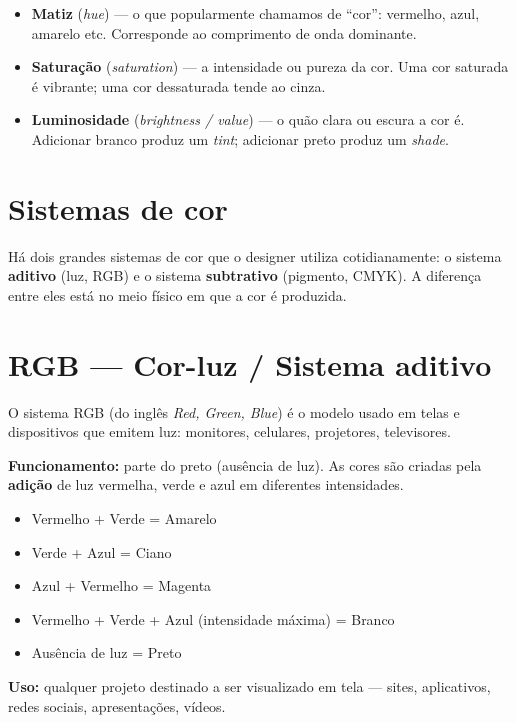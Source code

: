 \documentclass[a4paper,12pt]{article}
\begin{document}
\begin{itemize}[nosep]
  \item \textbf{Matiz} (\textit{hue}) --- o que popularmente chamamos de ``cor'': vermelho, azul, amarelo etc. Corresponde ao comprimento de onda dominante.
  \item \textbf{Saturação} (\textit{saturation}) --- a intensidade ou pureza da cor. Uma cor saturada é vibrante; uma cor dessaturada tende ao cinza.
  \item \textbf{Luminosidade} (\textit{brightness / value}) --- o quão clara ou escura a cor é. Adicionar branco produz um \textit{tint}; adicionar preto produz um \textit{shade}.
\end{itemize}

\section{Sistemas de cor}

Há dois grandes sistemas de cor que o designer utiliza cotidianamente: o sistema \textbf{aditivo} (luz, RGB) e o sistema \textbf{subtrativo} (pigmento, CMYK). A diferença entre eles está no meio físico em que a cor é produzida.

\section{RGB --- Cor-luz / Sistema aditivo}

O sistema RGB (do inglês \textit{Red, Green, Blue}) é o modelo usado em telas e dispositivos que emitem luz: monitores, celulares, projetores, televisores.

\bigskip
\noindent \textbf{Funcionamento:} parte do preto (ausência de luz). As cores são criadas pela \textbf{adição} de luz vermelha, verde e azul em diferentes intensidades.

\begin{itemize}[nosep]
  \item Vermelho + Verde = Amarelo
  \item Verde + Azul = Ciano
  \item Azul + Vermelho = Magenta
  \item Vermelho + Verde + Azul (intensidade máxima) = Branco
  \item Ausência de luz = Preto
\end{itemize}

\medskip
\noindent \textbf{Uso:} qualquer projeto destinado a ser visualizado em tela --- sites, aplicativos, redes sociais, apresentações, vídeos.
\end{document}
